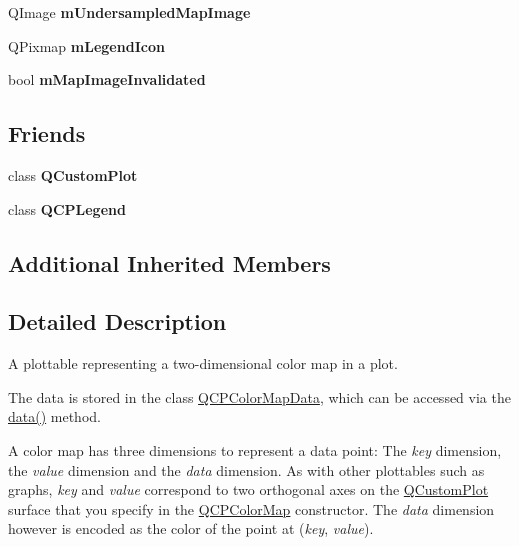 \begin{DoxyCompactItemize}
\item 
Q\+Image {\bfseries m\+Undersampled\+Map\+Image}\hypertarget{class_q_c_p_color_map_acad3d52f3572436d5f2e4057911ea8d3}{}\label{class_q_c_p_color_map_acad3d52f3572436d5f2e4057911ea8d3}

\item 
Q\+Pixmap {\bfseries m\+Legend\+Icon}\hypertarget{class_q_c_p_color_map_ada522988db02cb531767d38c5029ef60}{}\label{class_q_c_p_color_map_ada522988db02cb531767d38c5029ef60}

\item 
bool {\bfseries m\+Map\+Image\+Invalidated}\hypertarget{class_q_c_p_color_map_ac9aea6a5c193d7fa866bc7b26e79ef2c}{}\label{class_q_c_p_color_map_ac9aea6a5c193d7fa866bc7b26e79ef2c}

\end{DoxyCompactItemize}
\subsection*{Friends}
\begin{DoxyCompactItemize}
\item 
class {\bfseries Q\+Custom\+Plot}\hypertarget{class_q_c_p_color_map_a1cdf9df76adcfae45261690aa0ca2198}{}\label{class_q_c_p_color_map_a1cdf9df76adcfae45261690aa0ca2198}

\item 
class {\bfseries Q\+C\+P\+Legend}\hypertarget{class_q_c_p_color_map_a8429035e7adfbd7f05805a6530ad5e3b}{}\label{class_q_c_p_color_map_a8429035e7adfbd7f05805a6530ad5e3b}

\end{DoxyCompactItemize}
\subsection*{Additional Inherited Members}


\subsection{Detailed Description}
A plottable representing a two-\/dimensional color map in a plot. 



The data is stored in the class \hyperlink{class_q_c_p_color_map_data}{Q\+C\+P\+Color\+Map\+Data}, which can be accessed via the \hyperlink{class_q_c_p_color_map_a3ae12c9ce842352037cd20ea5267414f}{data()} method.

A color map has three dimensions to represent a data point\+: The {\itshape key} dimension, the {\itshape value} dimension and the {\itshape data} dimension. As with other plottables such as graphs, {\itshape key} and {\itshape value} correspond to two orthogonal axes on the \hyperlink{class_q_custom_plot}{Q\+Custom\+Plot} surface that you specify in the \hyperlink{class_q_c_p_color_map}{Q\+C\+P\+Color\+Map} constructor. The {\itshape data} dimension however is encoded as the color of the point at ({\itshape key}, {\itshape value}).

